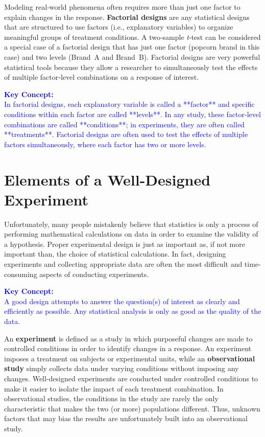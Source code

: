 \documentclass[
]{book}
\begin{document}
Modeling real‑world phenomena often requires more than just one factor to explain changes in the response. \textbf{Factorial designs} are any statistical designs that are structured to use factors (i.e., explanatory variables) to organize meaningful groups of treatment conditions. A two‑sample \emph{t}‑test can be considered a special case of a factorial design that has just one factor (popcorn brand in this case) and two levels (Brand~A and Brand~B). Factorial designs are very powerful statistical tools because they allow a researcher to simultaneously test the effects of multiple factor‑level combinations on a response of interest.

\textbf{\textcolor{blue}{Key Concept:}}\\
\textcolor{blue} {In factorial designs, each explanatory variable is called a **factor** and specific conditions within each factor are called **levels**. In any study, these factor‑level combinations are called **conditions**; in experiments, they are often called **treatments**. Factorial designs are often used to test the effects of multiple factors simultaneously, where each factor has two or more levels.}

\hypertarget{elements-of-a-well-designed-experiment}{%
\section{Elements of a Well-Designed Experiment}\label{elements-of-a-well-designed-experiment}}

Unfortunately, many people mistakenly believe that statistics is only a process of performing mathematical calculations on data in order to examine the validity of a hypothesis. Proper experimental design is just as important as, if not more important than, the choice of statistical calculations. In fact, designing experiments and collecting appropriate data are often the most difficult and time-consuming aspects of conducting experiments.

\textbf{\textcolor{blue}{Key Concept:}}\\
\textcolor{blue}{A good design attempts to answer the question(s) of interest as clearly and efficiently as possible. Any statistical analysis is only as good as the quality of the data.}

An \textbf{experiment} is defined as a study in which purposeful changes are made to controlled conditions in order to identify changes in a response. An experiment imposes a treatment on subjects or experimental units, while an \textbf{observational study} simply collects data under varying conditions without imposing any changes. Well-designed experiments are conducted under controlled conditions to make it easier to isolate the impact of each treatment combination. In observational studies, the conditions in the study are rarely the only characteristic that makes the two (or more) populations different. Thus, unknown factors that may bias the results are unfortunately built into an observational study.
\end{document}
